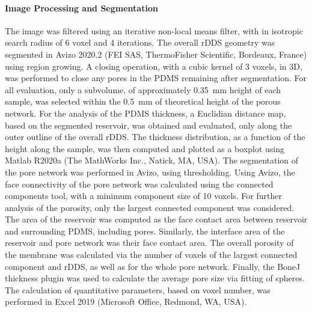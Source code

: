 \paragraph{Image Processing and Segmentation}
The image was filtered using an iterative non-local means filter\supercite{bruns2017looking}, with in isotropic search radius of 6 voxel and 4 iterations. The overall rDDS geometry was segmented in Avizo 2020.2 (FEI SAS, ThermoFisher Scientific, Bordeaux, France) using region growing. A closing operation, with a cubic kernel of 3 voxels, in 3D, was performed to close any pores in the PDMS remaining after segmentation. For all evaluation, only a subvolume, of approximately 0.35~mm height of each sample, was selected within the 0.5~mm of theoretical height of the porous network. For the analysis of the PDMS thickness, a Euclidian distance map, based on the segmented reservoir, was obtained and evaluated, only along the outer outline of the overall rDDS. The thickness distribution, as a function of the height along the sample, was then computed and plotted as a boxplot using Matlab R2020a (The MathWorks Inc., Natick, MA, USA). The segmentation of the pore network was performed in Avizo, using thresholding. Using Avizo, the face connectivity of the pore network was calculated using the connected components tool, with a minimum component size of 10 voxels. For further analysis of the porosity, only the largest connected component was considered. The area of the reservoir was computed as the face contact area between reservoir and surrounding PDMS, including pores. Similarly, the interface area of the reservoir and pore network was their face contact area. The overall porosity of the membrane was calculated via the number of voxels of the largest connected component and rDDS, as well as for the whole pore network. Finally, the BoneJ thickness plugin\supercite{doube2010bonej} was used to calculate the average pore size via fitting of spheres. The calculation of quantitative parameters, based on voxel number, was performed in Excel 2019 (Microsoft Office, Redmond, WA, USA).

